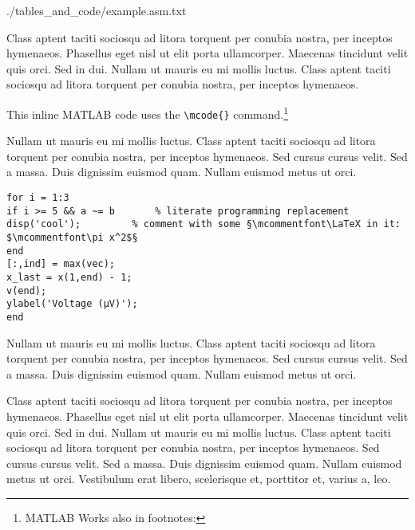 \begin{spacing}{0.5}
	
	{./tables_and_code/example.asm.txt}
\end{spacing}


Class aptent taciti sociosqu ad litora torquent per conubia nostra, per inceptos hymenaeos. Phasellus eget nisl ut elit porta ullamcorper. Maecenas tincidunt velit quis orci. Sed in dui. Nullam ut mauris eu mi mollis luctus. Class aptent taciti sociosqu ad litora torquent per conubia nostra, per inceptos hymenaeos.

This inline MATLAB code  uses the \verb|\mcode{}| command.\footnote{MATLAB Works also in footnotes: }

Nullam ut mauris eu mi mollis luctus. Class aptent taciti sociosqu ad litora torquent per conubia nostra, per inceptos hymenaeos. Sed cursus cursus velit. Sed a massa. Duis dignissim euismod quam. Nullam euismod metus ut orci.

\begin{lstlisting}[language=matlabfloz,caption={\mcode{Matlab Function}}]
for i = 1:3
if i >= 5 && a ~= b       % literate programming replacement
disp('cool');         % comment with some §\mcommentfont\LaTeX in it: $\mcommentfont\pi x^2$§
end
[:,ind] = max(vec);
x_last = x(1,end) - 1;
v(end);
ylabel('Voltage (µV)');
end
\end{lstlisting}

Nullam ut mauris eu mi mollis luctus. Class aptent taciti sociosqu ad litora torquent per conubia nostra, per inceptos hymenaeos. Sed cursus cursus velit. Sed a massa. Duis dignissim euismod quam. Nullam euismod metus ut orci.



Class aptent taciti sociosqu ad litora torquent per conubia nostra, per inceptos hymenaeos. Phasellus eget nisl ut elit porta ullamcorper. Maecenas tincidunt velit quis orci. Sed in dui. Nullam ut mauris eu mi mollis luctus. Class aptent taciti sociosqu ad litora torquent per conubia nostra, per inceptos hymenaeos. Sed cursus cursus velit. Sed a massa. Duis dignissim euismod quam. Nullam euismod metus ut orci. Vestibulum erat libero, scelerisque et, porttitor et, varius a, leo.


